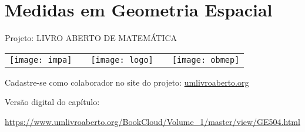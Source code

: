 
\ifnum{}
\renewcommand\chapterillustration{./abertura-perspectiva1}
\else
\renewcommand\chapterillustration{./abertura-perspectiva1-professor}
\fi

\def\chapterwhat{Conceito de volume (unidade, aditividade e conservação). Diversos usos de volumes e grandezas relacionadas, como área, densidade, concentração. Compressibilidade de materiais. Posições relativas de planos e planos e planos e retas. Planificações e cortes de sólidos. Cálculo de áreas e volumes de figuras clássicas e obtenção das fórmulas. Aproximação de áreas e volumes considerando o erro. Princípio de Cavalieri e aplicações.}

\def\chapterbecause{Áreas e volumes são conceitos elementares que estão presentes de maneira direta na vida cotidiana do cidadão e também são necessários para outras ciências, como a Química, a Biologia e a Física. O entendimento destes conceitos e de suas relações com outras grandezas são fundamentais e basta m para a maioria dos usos corriqueiros. Aqui, o estudo de áreas e volumes serve de plano de fundo para o aperfeiçoamento do entendimento de número real, de aproximação com erro, para o desenvolvimento da habilidade de visualização espacial e para a resolução de problemas.} 

\chapter{Medidas em Geometria Espacial}


\mbox{}\thispagestyle{empty}\clearpage

\thispagestyle{empty}

\begin{center}
Projeto: LIVRO ABERTO DE MATEMÁTICA

\noindent \begin{tabular}{lcccr}
\texttt{[image: impa]}& \quad\quad& \texttt{[image: logo]} & \quad\quad& \texttt{[image: obmep]} 
\end{tabular}
\end{center}

\vspace*{.3cm}

Cadastre-se como colaborador no site do projeto: \url{umlivroaberto.org}

Versão digital do capítulo:

\url{https://www.umlivroaberto.org/BookCloud/Volume_1/master/view/GE504.html}


